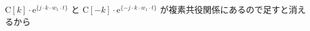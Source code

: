 \correct
$\textrm{C}[k] \cdot \textrm{e}^{\{j \cdot k \cdot w_1 \cdot t \}} $
と
$\textrm{C}[-k] \cdot \textrm{e}^{\{-j \cdot k \cdot w_1 \cdot t \}} $
が複素共役関係にあるので足すと消えるから
